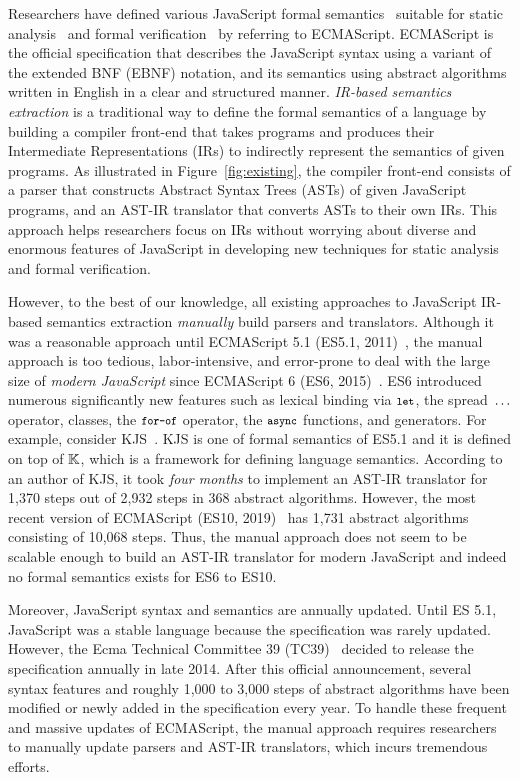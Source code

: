 Researchers have defined various JavaScript formal
semantics~\cite{aplas08,lambdajs,kjs,javert} suitable for static
analysis~\cite{jsai,tajs,wala,safe} and formal verification~\cite{javert} by
referring to ECMAScript.  ECMAScript is the official specification that
describes the JavaScript syntax using a variant of the extended BNF (EBNF) notation,
and its semantics using abstract algorithms written in English in a clear and
structured manner.  \textit{IR-based semantics extraction} is a traditional way to
define the formal semantics of a language by building a compiler front-end
that takes programs and produces their Intermediate
Representations (IRs) to indirectly represent the semantics of given programs.
As illustrated in Figure~\ref{fig:existing}, the compiler front-end consists of a parser
that constructs Abstract Syntax Trees (ASTs) of given JavaScript programs, and
an AST-IR translator that converts ASTs to their own IRs.  This approach helps
researchers focus on IRs without worrying about diverse and enormous features of
JavaScript in developing new techniques for static analysis and formal
verification.

However, to the best of our knowledge, all existing approaches to JavaScript
IR-based semantics extraction \textit{manually} build parsers and translators.
Although it was a reasonable approach until ECMAScript 5.1 (ES5.1,
2011)~\cite{es5}, the manual approach is too tedious, labor-intensive, and
error-prone to deal with the large size of \textit{modern JavaScript} since ECMAScript 6
(ES6, 2015)~\cite{es6}. ES6 introduced numerous significantly new features such
as lexical binding via \( \texttt{\footnotesize let} \), the spread \( \texttt{\footnotesize...} \) operator,
classes, the \( \texttt{\footnotesize for-of} \) operator, the \( \texttt{\footnotesize async} \) functions, and
generators.  For example, consider KJS~\cite{kjs}.
KJS is one of formal semantics of ES5.1
and it is defined on top of \( \mathbb{K} \), which is a framework for
defining language semantics.  According to an author of KJS, it took
\textit{four months} to implement an AST-IR translator for 1,370 steps out of 2,932
steps in 368 abstract algorithms. However, the most recent version of ECMAScript
(ES10, 2019)~\cite{es10} has 1,731 abstract algorithms consisting of 10,068
steps. Thus, the manual approach does not seem to be scalable enough to build
an AST-IR translator for modern JavaScript
and indeed no formal semantics exists for ES6 to ES10.

Moreover, JavaScript syntax and semantics are annually updated.  Until
ES 5.1, JavaScript was a stable language because the specification was
rarely updated.  However, the Ecma Technical Committee 39 (TC39)~\cite{tc39}
decided to release the specification annually in late 2014.  After this official
announcement, several syntax features and roughly 1,000 to 3,000 steps of
abstract algorithms have been modified or newly added in the specification every year.
To handle these frequent and massive updates of ECMAScript,
the manual approach requires researchers to manually update parsers and AST-IR translators,
which incurs tremendous efforts.

